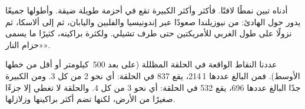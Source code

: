  أدناه تبين نمطًا لافتًا. فأكثر  وأكثر  الكبيرة تقع في
أحزمة طويلة ضيقة. وأطولها جميعًا يدور حول  الهادئ: من نيوزيلندا صعودًا
عبر إندونيسيا والفلبين واليابان، ثم إلى ألاسكا، ثم نزولًا على طول 
الغربي للأمريكتين حتى طرف تشيلي. ولكثرة براكينه، كثيرًا ما يسمى
«حزام النار».

\begin{example}\label{ex:g4:volcanoes-earthquakes-first-look:shares}
عددنا النقاط الواقعة في الحلقة المظللة (على بعد 500~كيلومتر أو أقل من
خطها الأوسط). فمن  البالغ عددها 1\,214، يقع 837 في الحلقة: أي نحو 2
من كل 3. ومن  الكبيرة جدًا البالغ عددها 696، يقع 532 في الحلقة: أي
نحو 3 من كل 4. والحلقة لا تغطي إلا جزءًا صغيرًا من الأرض، لكنها تضم أكثر
براكينها وزلازلها.
\end{example}


